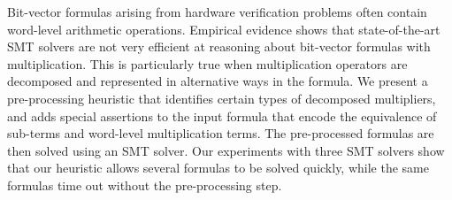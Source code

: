 %
%
Bit-vector formulas arising from hardware verification problems often
contain word-level arithmetic operations.  Empirical evidence shows
that state-of-the-art SMT solvers are not very efficient at reasoning about
bit-vector formulas with multiplication.  This is particularly true
when multiplication operators are decomposed and represented in
alternative ways in the formula. %
%
%
We present a pre-processing heuristic that identifies certain types of
decomposed multipliers, and adds special assertions to the input
formula that encode the equivalence of sub-terms and word-level
multiplication terms.  The pre-processed formulas are then solved using an
SMT solver.  Our experiments with three  SMT solvers
show that our heuristic allows several formulas to be solved quickly,
while the same formulas time out without the pre-processing step.
%


